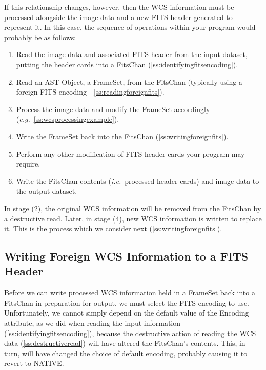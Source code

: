 \documentclass[twoside,11pt]{article}
\newcommand{\htmlref}[2]{#1}
\newcommand{\secref}[1]{\S\ref{#1}}
\renewcommand{\secref}[1]{\ref{#1}}
\begin{document}
If this relationship changes, however, then the WCS information must
be processed alongside the image data and a new FITS header generated
to represent it. In this case, the sequence of operations within your
program would probably be as follows:

\begin{enumerate}
\item Read the image data and associated FITS header from the input
dataset, putting the header cards into a \htmlref{FitsChan}{FitsChan}
(\secref{ss:identifyingfitsencoding}).

\item Read an AST \htmlref{Object}{Object}, a \htmlref{FrameSet}{FrameSet}, from the FitsChan (typically
using a foreign FITS encoding---\secref{ss:readingforeignfits}).

\item Process the image data and modify the FrameSet accordingly
({\em{e.g.}}~\secref{ss:wcsprocessingexample}).

\item Write the FrameSet back into the FitsChan
(\secref{ss:writingforeignfits}).

\item Perform any other modification of FITS header cards your program
may require.

\item Write the FitsChan contents ({\em{i.e.}}\ processed header
cards) and image data to the output dataset.
\end{enumerate}

In stage (2), the original WCS information will be removed from the
FitsChan by a destructive read. Later, in stage (4), new WCS
information is written to replace it. This is the process which we
consider next (\secref{ss:writingforeignfits}).

\subsection{\label{ss:writingforeignfits}Writing Foreign WCS Information to a FITS Header}

Before we can write processed WCS information held in a \htmlref{FrameSet}{FrameSet} back
into a \htmlref{FitsChan}{FitsChan} in preparation for output, we must select the FITS
encoding to use.  Unfortunately, we cannot simply depend on the
default value of the \htmlref{Encoding}{Encoding} attribute, as we did when reading the
input information (\secref{ss:identifyingfitsencoding}), because the
destructive action of reading the WCS data
(\secref{ss:destructiveread}) will have altered the FitsChan's
contents. This, in turn, will have changed the choice of default
encoding, probably causing it to revert to NATIVE.
\end{document}
